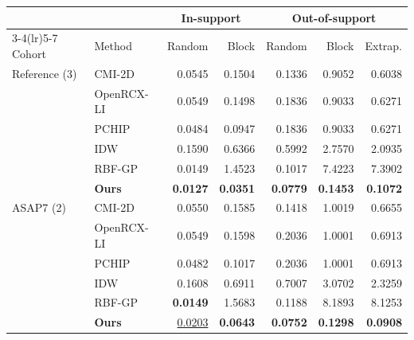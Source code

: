\footnotesize
\setlength{\tabcolsep}{3pt}
\begin{tabular*}{\linewidth}{@{\extracolsep{\fill}}llrrrrr@{}}\toprule
 &  & \multicolumn{2}{c}{In-support} & \multicolumn{3}{c}{Out-of-support} \\
\cmidrule(lr){3-4}\cmidrule(lr){5-7}
Cohort & Method & Random & Block & Random & Block & Extrap. \\
\midrule
Reference (3) & CMI-2D & 0.0545 & 0.1504 & 0.1336 & 0.9052 & 0.6038 \\
 & OpenRCX-LI & 0.0549 & 0.1498 & 0.1836 & 0.9033 & 0.6271 \\
 & PCHIP & 0.0484 & 0.0947 & 0.1836 & 0.9033 & 0.6271 \\
 & IDW & 0.1590 & 0.6366 & 0.5992 & 2.7570 & 2.0935 \\
 & RBF-GP & 0.0149 & 1.4523 & 0.1017 & 7.4223 & 7.3902 \\
 & \textbf{Ours} & \textbf{0.0127} & \textbf{0.0351} & \textbf{0.0779} & \textbf{0.1453} & \textbf{0.1072} \\
\midrule
ASAP7 (2) & CMI-2D & 0.0550 & 0.1585 & 0.1418 & 1.0019 & 0.6655 \\
 & OpenRCX-LI & 0.0549 & 0.1598 & 0.2036 & 1.0001 & 0.6913 \\
 & PCHIP & 0.0482 & 0.1017 & 0.2036 & 1.0001 & 0.6913 \\
 & IDW & 0.1608 & 0.6911 & 0.7007 & 3.0702 & 2.3259 \\
 & RBF-GP & \textbf{0.0149} & 1.5683 & 0.1188 & 8.1893 & 8.1253 \\
 & \textbf{Ours} & \underline{0.0203} & \textbf{0.0643} & \textbf{0.0752} & \textbf{0.1298} & \textbf{0.0908} \\
\bottomrule\end{tabular*}

